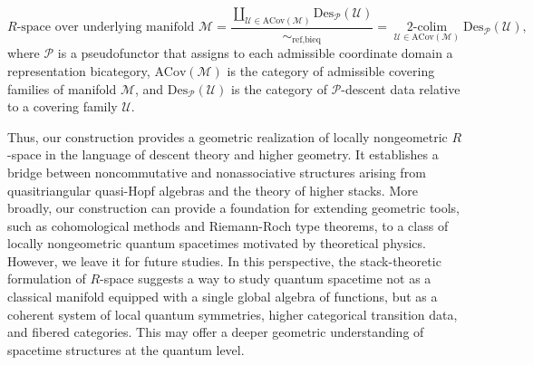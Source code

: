 \documentclass[reqno]{amsart}
\theoremstyle{definition}
\theoremstyle{remark}
\begin{document}
\begin{equation*}
\boxed{
R\text{-space over underlying manifold }\mathcal{M} =\dfrac{\coprod\limits_{\mathcal{U}\in\text{ACov}(\mathcal{M})} {\text{Des}_\mathscr{P}(\mathcal{U})}}{\sim_{\text{ref,bieq}}} = \mathop{2\text{-colim}}\limits_{\mathcal{U}\in\text{ACov}(\mathcal{M})}{\text{Des}_\mathscr{P}(\mathcal{U})},
}
\end{equation*}
where $\mathscr{P}$ is a pseudofunctor that assigns to each admissible coordinate domain a representation bicategory, $\text{ACov}(\mathcal{M})$ is the category of admissible covering families of manifold $\mathcal{M}$, and ${\text{Des}_\mathscr{P}(\mathcal{U})}$ is the category of $\mathscr{P}$-descent data relative to a covering family $\mathcal{U}$.

Thus, our construction provides a geometric realization of locally nongeometric $R$-space in the language of descent theory and higher geometry. It establishes a bridge between noncommutative and nonassociative structures arising from quasitriangular quasi-Hopf algebras and the theory of higher stacks. More broadly, our construction can provide a foundation for extending geometric tools, such as cohomological methods and Riemann-Roch type theorems, to a class of locally nongeometric quantum spacetimes motivated by theoretical physics. However, we leave it for future studies. In this perspective, the stack-theoretic formulation of $R$-space suggests a way to study quantum spacetime not as a classical manifold equipped with a single global algebra of functions, but as a coherent system of local quantum symmetries, higher categorical transition data, and fibered categories. This may offer a deeper geometric understanding of spacetime structures at the quantum level.






\end{document}
